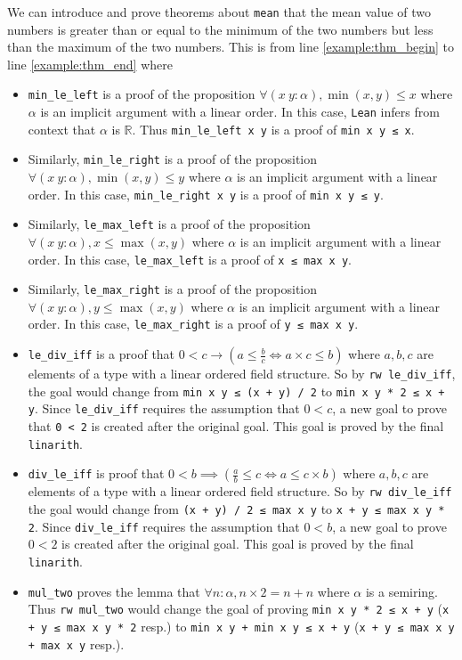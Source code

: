 \documentclass{report}
\theoremstyle{definition}
\theoremstyle{plain}
\begin{document}
We can introduce and prove theorems about {\tt mean} that the mean value of two numbers is greater than or equal to the minimum of the two numbers but less than the maximum of the two numbers. This is from line \ref{example:thm_begin} to line \ref{example:thm_end} where
\begin{itemize}
  \item {\tt min\_le\_left} is a proof of the proposition $\forall (x\ y : \alpha), \min(x, y) \le x$ where $\alpha$ is an implicit argument with a linear order. In this case, {\tt Lean} infers from context that $\alpha$ is $\mathbb R$. Thus {\tt min\_le\_left x y} is a proof of {\tt min x y ≤ x}.
  \item Similarly, {\tt min\_le\_right} is a proof of the proposition $\forall (x\ y : \alpha), \min(x, y) \le y$ where $\alpha$ is an implicit argument with a linear order. In this case, {\tt min\_le\_right x y} is a proof of {\tt min x y ≤ y}.
  \item Similarly, {\tt le\_max\_left} is a proof of the proposition $\forall (x\ y : \alpha), x \le \max(x, y)$ where $\alpha$ is an implicit argument with a linear order. In this case, {\tt le\_max\_left} is a proof of {\tt x ≤ max x y}.
  \item Similarly, {\tt le\_max\_right} is a proof of the proposition $\forall (x\ y : \alpha), y \le \max(x, y)$ where $\alpha$ is an implicit argument with a linear order. In this case, {\tt le\_max\_right} is a proof of {\tt y ≤ max x y}.
  \item {\tt le\_div\_iff} is a proof that $0 < c \to (a \le \frac{b}{c} \iff a\times c \le b)$ where $a,b,c$ are elements of a type with a linear ordered field structure. So by {\tt rw le\_div\_iff}, the goal would change from {\tt min x y ≤ (x + y) / 2} to {\tt min x y * 2 ≤ x + y}. Since {\tt le\_div\_iff} requires the assumption that $0<c$, a new goal to prove that {\tt 0 < 2} is created after the original goal. This goal is proved by the final {\tt linarith}.
  \item {\tt div\_le\_iff} is proof that $0 < b \implies (\frac a b \le c \iff a \le c \times b)$ where $a,b,c$ are elements of a type with a linear ordered field structure. So by {\tt rw div\_le\_iff} the goal would change from {\tt (x + y) / 2 ≤ max x y} to {\tt x + y ≤ max x y * 2}. Since {\tt div\_le\_iff} requires the assumption that $0 < b$, a new goal to prove $0 < 2$ is created after the original goal. This goal is proved by the final {\tt linarith}.
  \item {\tt mul\_two} proves the lemma that $\forall n:\alpha, n\times 2 = n+n$ where $\alpha$ is a semiring. Thus {\tt rw mul\_two} would change the goal of proving {\tt min x y * 2 ≤ x + y} ({\tt x + y ≤ max x y * 2} resp.) to {\tt min x y + min x y ≤ x + y} ({\tt x + y ≤ max x y + max x y} resp.).

\end{itemize}
\end{document}
